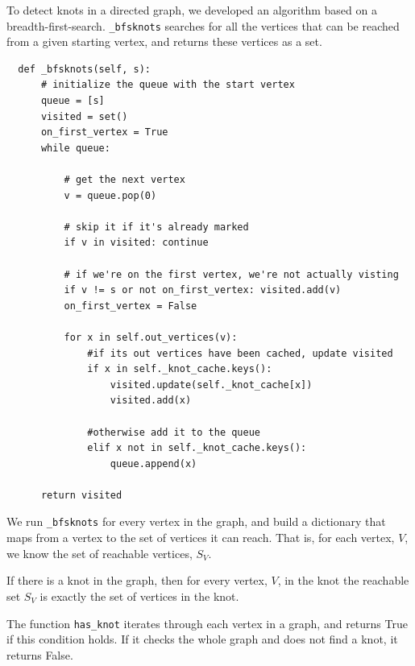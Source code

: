 \documentclass[10pt]{book}
\begin{document}

To detect knots in a directed graph, we developed an algorithm based
on a breadth-first-search. \verb"_bfsknots" searches for all the
vertices that can be reached from a given starting vertex, and returns
these vertices as a set.

\begin{verbatim}
  def _bfsknots(self, s):
      # initialize the queue with the start vertex
      queue = [s]
      visited = set()
      on_first_vertex = True
      while queue:

          # get the next vertex
          v = queue.pop(0)

          # skip it if it's already marked
          if v in visited: continue

          # if we're on the first vertex, we're not actually visting
          if v != s or not on_first_vertex: visited.add(v)
          on_first_vertex = False
            
          for x in self.out_vertices(v):
              #if its out vertices have been cached, update visited
              if x in self._knot_cache.keys():
                  visited.update(self._knot_cache[x])
                  visited.add(x)
                    
              #otherwise add it to the queue
              elif x not in self._knot_cache.keys():
                  queue.append(x)

      return visited
\end{verbatim}

We run \verb"_bfsknots" for every vertex in
the graph, and build a dictionary that maps from a vertex to the
set of vertices it can reach.  That is, for each vertex, $V$, we
know the set of reachable vertices, $S_V$.

If there is a knot in the graph, then for every vertex, $V$, in the
knot the reachable set $S_V$ is exactly the set of vertices in the knot.

The function \verb"has_knot" iterates through each vertex in a graph,
and returns True if this condition holds. If
it checks the whole graph and does not find a knot, it returns False.
\end{document}
